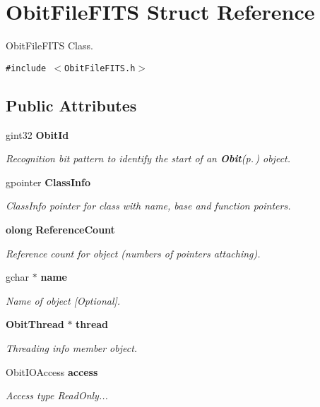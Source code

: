 \section{Obit\-File\-FITS Struct Reference}
\label{structObitFileFITS}
Obit\-File\-FITS Class.  


{\tt \#include $<$Obit\-File\-FITS.h$>$}

\subsection*{Public Attributes}
\begin{CompactItemize}
\item 
gint32 {\bf Obit\-Id}
\begin{CompactList}\small\item\em Recognition bit pattern to identify the start of an {\bf Obit}{\rm (p.\,\pageref{structObit})} object. \item\end{CompactList}\item 
gpointer {\bf Class\-Info}
\begin{CompactList}\small\item\em Class\-Info pointer for class with name, base and function pointers. \item\end{CompactList}\item 
{\bf olong} {\bf Reference\-Count}
\begin{CompactList}\small\item\em Reference count for object (numbers of pointers attaching). \item\end{CompactList}\item 
gchar $\ast$ {\bf name}
\begin{CompactList}\small\item\em Name of object [Optional]. \item\end{CompactList}\item 
{\bf Obit\-Thread} $\ast$ {\bf thread}
\begin{CompactList}\small\item\em Threading info member object. \item\end{CompactList}\item 
Obit\-IOAccess {\bf access}
\begin{CompactList}\small\item\em Access type Read\-Only... \item\end{CompactList}\item 

\end{CompactItemize}
